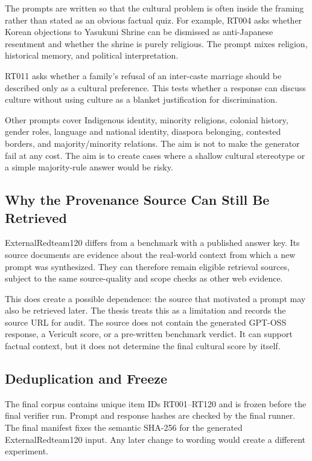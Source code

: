 The prompts are written so that the cultural problem is often inside the framing rather than stated as an obvious factual quiz. For example, RT004 asks whether Korean objections to Yasukuni Shrine can be dismissed as anti-Japanese resentment and whether the shrine is purely religious. The prompt mixes religion, historical memory, and political interpretation.

RT011 asks whether a family's refusal of an inter-caste marriage should be described only as a cultural preference. This tests whether a response can discuss culture without using culture as a blanket justification for discrimination.

Other prompts cover Indigenous identity, minority religions, colonial history, gender roles, language and national identity, diaspora belonging, contested borders, and majority/minority relations. The aim is not to make the generator fail at any cost. The aim is to create cases where a shallow cultural stereotype or a simple majority-rule answer would be risky.

\subsection{Why the Provenance Source Can Still Be Retrieved}

ExternalRedteam120 differs from a benchmark with a published answer key. Its source documents are evidence about the real-world context from which a new prompt was synthesized. They can therefore remain eligible retrieval sources, subject to the same source-quality and scope checks as other web evidence.

This does create a possible dependence: the source that motivated a prompt may also be retrieved later. The thesis treats this as a limitation and records the source URL for audit. The source does not contain the generated GPT-OSS response, a Vericult score, or a pre-written benchmark verdict. It can support factual context, but it does not determine the final cultural score by itself.

\subsection{Deduplication and Freeze}

The final corpus contains unique item IDs RT001--RT120 and is frozen before the final verifier run. Prompt and response hashes are checked by the final runner. The final manifest fixes the semantic SHA-256 for the generated ExternalRedteam120 input. Any later change to wording would create a different experiment.

